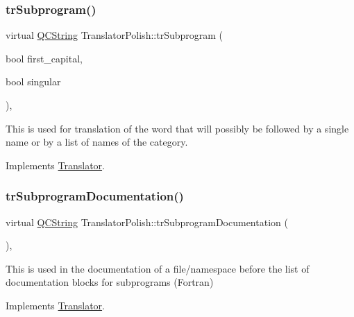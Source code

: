 \mbox{\label{class_translator_polish_a35d361eaaeb396e2a4f622a0c4514f80}} 
\subsubsection{\texorpdfstring{trSubprogram()}{trSubprogram()}}
{\footnotesize\ttfamily virtual \mbox{\hyperlink{class_q_c_string}{Q\+C\+String}} Translator\+Polish\+::tr\+Subprogram (\begin{DoxyParamCaption}\item[{bool}]{first\+\_\+capital,  }\item[{bool}]{singular }\end{DoxyParamCaption})\hspace{0.3cm}{\ttfamily [inline]}, {\ttfamily [virtual]}}

This is used for translation of the word that will possibly be followed by a single name or by a list of names of the category. 

Implements \mbox{\hyperlink{class_translator}{Translator}}.

\mbox{\label{class_translator_polish_a7759af3d313fcb8cf172524cbcf893b4}} 
\subsubsection{\texorpdfstring{trSubprogramDocumentation()}{trSubprogramDocumentation()}}
{\footnotesize\ttfamily virtual \mbox{\hyperlink{class_q_c_string}{Q\+C\+String}} Translator\+Polish\+::tr\+Subprogram\+Documentation (\begin{DoxyParamCaption}{ }\end{DoxyParamCaption})\hspace{0.3cm}{\ttfamily [inline]}, {\ttfamily [virtual]}}

This is used in the documentation of a file/namespace before the list of documentation blocks for subprograms (Fortran) 

Implements \mbox{\hyperlink{class_translator}{Translator}}.

\mbox{\label{class_translator_polish_a609501559ed02c21bc28c58db50157b7}} 
